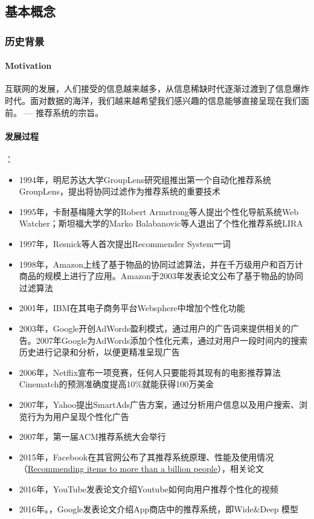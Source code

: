 \subsection{基本概念}

\subsubsection{历史背景}
\paragraph{Motivation}互联网的发展，人们接受的信息越来越多，从信息稀缺时代逐渐过渡到了信息爆炸时代。面对数据的海洋，我们越来越希望我们感兴趣的信息能够直接呈现在我们面前。 --- 推荐系统的宗旨。

\paragraph{发展过程}：
\begin{itemize}
	\item 1994年，明尼苏达大学GroupLens研究组推出第一个自动化推荐系统GroupLens，提出将协同过滤作为推荐系统的重要技术
	\item 1995年，卡耐基梅隆大学的Robert Armstrong等人提出个性化导航系统Web Watcher；斯坦福大学的Marko Balabanovic等人退出了个性化推荐系统LIRA
	\item 1997年，Resnick等人首次提出Recommender System一词
 	\item 1998年，Amazon上线了基于物品的协同过滤算法，并在千万级用户和百万计商品的规模上进行了应用。Amazon于2003年发表论文\cite{linden2003amazon.com}公布了基于物品的协同过滤算法
	\item 2001年，IBM在其电子商务平台Websphere中增加个性化功能
	\item 2003年，Google开创AdWords盈利模式，通过用户的广告词来提供相关的广告。2007年Google为AdWords添加个性化元素，通过对用户一段时间内的搜索历史进行记录和分析，以便更精准呈现广告
	\item 2006年，Netflix宣布一项竞赛，任何人只要能将其现有的电影推荐算法Cinematch的预测准确度提高10\%就能获得100万美金
	\item 2007年，Yahoo提出SmartAds广告方案，通过分析用户信息以及用户搜索、浏览行为为用户呈现个性化广告
	\item 2007年，第一届ACM推荐系统大会举行
	\item 2015年，Facebook在其官网公布了其推荐系统原理、性能及使用情况（\href{https://engineering.fb.com/2015/06/02/core-data/recommending-items-to-more-than-a-billion-people/}{Recommending items to more than a billion people}），相关论文\cite{he2014practical}
	\item 2016年，YouTube发表论文\cite{covington2016deep}介绍Youtube如何向用户推荐个性化的视频
	\item 2016年。，Google发表论文\cite{cheng2016wide}介绍App商店中的推荐系统，即Wide\&Deep 模型
\end{itemize}

